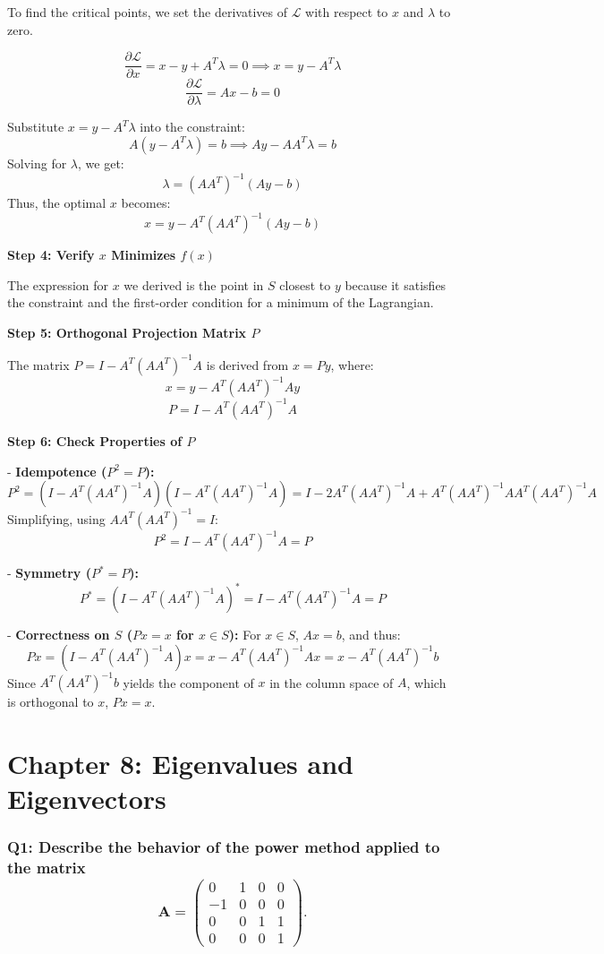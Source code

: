 \documentclass[8pt]{article}
\begin{document}
To find the critical points, we set the derivatives of \(\mathcal{L}\) with respect to \(x\) and \(\lambda\) to zero.

\[
\frac{\partial \mathcal{L}}{\partial x} = x - y + A^T \lambda = 0 \implies x = y - A^T \lambda
\]
\[
\frac{\partial \mathcal{L}}{\partial \lambda} = Ax - b = 0
\]

Substitute \(x = y - A^T \lambda\) into the constraint:
\[
A(y - A^T \lambda) = b \implies Ay - AA^T \lambda = b
\]
Solving for \(\lambda\), we get:
\[
\lambda = (AA^T)^{-1}(Ay - b)
\]
Thus, the optimal \(x\) becomes:
\[
x = y - A^T (AA^T)^{-1} (Ay - b)
\]

\textbf{Step 4: Verify \(x\) Minimizes \(f(x)\)}

The expression for \(x\) we derived is the point in \(S\) closest to \(y\) because it satisfies the constraint and the first-order condition for a minimum of the Lagrangian.

\textbf{Step 5: Orthogonal Projection Matrix \(P\)}

The matrix \(P = I - A^T (AA^T)^{-1} A\) is derived from \(x = Py\), where:
\[
x = y - A^T (AA^T)^{-1} A y
\]
\[
P = I - A^T (AA^T)^{-1} A
\]

\textbf{Step 6: Check Properties of \(P\)}

- \textbf{Idempotence (\(P^2 = P\)):}
\[
P^2 = (I - A^T (AA^T)^{-1} A)(I - A^T (AA^T)^{-1} A) = I - 2A^T (AA^T)^{-1} A + A^T (AA^T)^{-1} AA^T (AA^T)^{-1} A
\]
Simplifying, using \(AA^T (AA^T)^{-1} = I\):
\[
P^2 = I - A^T (AA^T)^{-1} A = P
\]

- \textbf{Symmetry (\(P^* = P\)):}
\[
P^* = (I - A^T (AA^T)^{-1} A)^* = I - A^T (AA^T)^{-1} A = P
\]

- \textbf{Correctness on \(S\) (\(Px = x\) for \(x \in S\)):}
For \(x \in S\), \(Ax = b\), and thus:
\[
Px = (I - A^T (AA^T)^{-1} A)x = x - A^T (AA^T)^{-1} Ax = x - A^T (AA^T)^{-1}b
\]
Since \(A^T (AA^T)^{-1}b\) yields the component of \(x\) in the column space of \(A\), which is orthogonal to \(x\), \(Px = x\).

\newpage
\section*{Chapter 8: Eigenvalues and Eigenvectors}

\subsubsection*{Q1: Describe the behavior of the power method applied to the matrix
\[ 
\mathbf{A} = 
\begin{pmatrix}
0 & 1 & 0 & 0 \\
-1 & 0 & 0 & 0 \\
0 & 0 & 1 & 1 \\
0 & 0 & 0 & 1 
\end{pmatrix}. 
\]}
\end{document}
